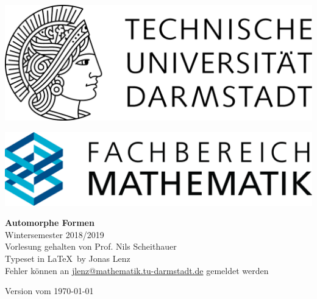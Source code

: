 \documentclass[12pt,a4paper,twoside]{scrreprt}
\begin{document}
\hypersetup{pageanchor=false}
\begin{titlepage}
  \begin{center}
    \vspace{1cm}
    \includegraphics[width=0.5\linewidth]{TU_Darmstadt_Logo.pdf}
    \vspace{1cm}
    
    \includegraphics[width=0.5\linewidth]{FB_Mathematik_Logo.png}
    \vspace{3.5cm}
    
    \Huge{\textbf{Automorphe Formen}\\}
    \vspace*{0.5cm}    
    \Large{{Wintersemester 2018/2019}\\}
    \vspace*{0.5cm}    
    \small{Vorlesung gehalten von Prof. Nils Scheithauer\\}
    \vspace*{1.0cm}
    \small{Typeset in \LaTeX\ by Jonas Lenz\\}
    \small{Fehler können an \url{jlenz@mathematik.tu-darmstadt.de} gemeldet werden}

    \vspace*{\fill}
    \small{Version vom \today}
  \end{center}
\end{titlepage}

\hypersetup{pageanchor=true}
\tableofcontents














\end{document}
